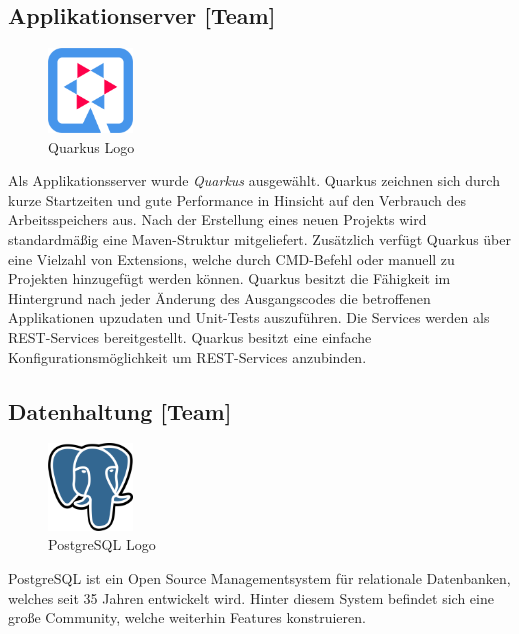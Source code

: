 \subsection{Applikationserver [Team]}
\begin{figure}
    \begin{center}
      \includegraphics[width=0.2\textwidth]{pics/quarkus_logo.png}
     \caption{Quarkus Logo}
    \end{center}
  \end{figure}
Als Applikationsserver wurde \emph{Quarkus} ausgewählt. Quarkus zeichnen sich  durch kurze Startzeiten und gute Performance in Hinsicht auf den Verbrauch des Arbeitsspeichers aus. Nach der Erstellung eines neuen Projekts wird standardmäßig eine Maven-Struktur mitgeliefert. Zusätzlich verfügt Quarkus über eine Vielzahl von Extensions, welche durch CMD-Befehl oder manuell zu Projekten hinzugefügt werden können. \cite{QuarkusAbout, QuarkusFirstApplication}
Quarkus besitzt die Fähigkeit im Hintergrund nach jeder Änderung des Ausgangscodes die betroffenen Applikationen upzudaten und Unit-Tests auszuführen.
Die Services werden als REST-Services bereitgestellt. Quarkus besitzt eine einfache Konfigurationsmöglichkeit um REST-Services anzubinden. 

\subsection{Datenhaltung [Team]}
\begin{figure}
    \begin{center}
      \includegraphics[width=0.2\textwidth]{pics/postgres_logo.png}
     \caption{PostgreSQL Logo}
    \end{center}
  \end{figure}
PostgreSQL ist ein Open Source Managementsystem für relationale Datenbanken, welches seit 35 Jahren entwickelt wird. Hinter diesem System befindet sich eine große Community, welche weiterhin Features konstruieren. \cite{PostgreSQLAbout}






